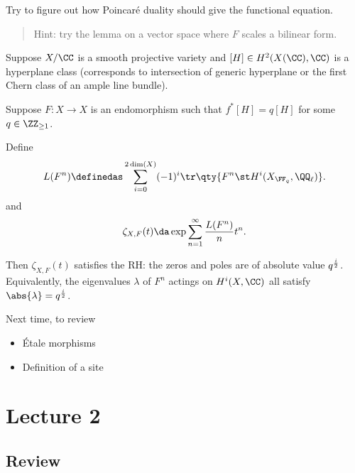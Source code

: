 \begin{exercise}

Try to figure out how Poincaré duality should give the functional
equation.

\begin{quote}
Hint: try the lemma on a vector space where \(F\) scales a bilinear
form.
\end{quote}

\end{exercise}

\begin{theorem}

Suppose \(X/\CC\) is a smooth projective variety and
\([H] \in H^2(X(\CC), \CC)\) is a hyperplane class (corresponds to
intersection of generic hyperplane or the first Chern class of an ample
line bundle).

Suppose \(F:X\to X\) is an endomorphism such that \(f^*[H] = q[H]\) for
some \(q\in \ZZ_{\geq 1}\).

Define
\begin{align*}  
L(F^n) \definedas 
\sum_{i=0}^{2\dim(X)} (-1)^i \tr\qty{ F^n \st H^i(X_{\FF_q}, \QQ_\ell)}
.\end{align*} and
\begin{align*}  
\zeta_{X, F}(t) \da
\exp{\sum_{n=1}^\infty {L(F^n) \over n}t^n }
.\end{align*}

Then \(\zeta_{X, F}(t)\) satisfies the RH: the zeros and poles are of
absolute value \(q^{i\over 2}\). Equivalently, the eigenvalues
\(\lambda\) of \(F^n\) actings on \(H^i(X, \CC)\) all satisfy
\(\abs{\lambda} = q^{i\over 2}\).

\end{theorem}

Next time, to review

\begin{itemize}
\tightlist
\item
  Étale morphisms
\item
  Definition of a site
\end{itemize}

\hypertarget{lecture-2}{%
\section{Lecture 2}\label{lecture-2}}

\hypertarget{review}{%
\subsection{Review}\label{review}}

